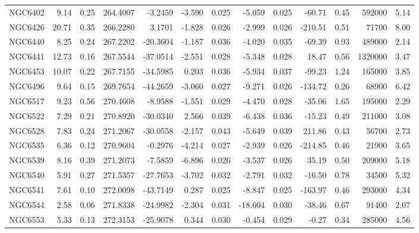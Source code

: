 \begin{longtable}{ | l | r | r| r | r | r | r | r | r | r | r | r | r  |}
            NGC6402       &   9.14 & 0.25 & 264.4007 &  -3.2459 &  -3.590 & 0.025 &  -5.059 &  0.025 &  -60.71 &  0.45 &  592000 &  5.14\\ 
            NGC6426       &  20.71 & 0.35 & 266.2280 &   3.1701 &  -1.828 & 0.026 &  -2.999 &  0.026 & -210.51 &  0.51 &   71700 &  8.00\\ 
            NGC6440       &   8.25 & 0.24 & 267.2202 & -20.3604 &  -1.187 & 0.036 &  -4.020 &  0.035 &  -69.39 &  0.93 &  489000 &  2.14\\ 
            NGC6441       &  12.73 & 0.16 & 267.5544 & -37.0514 &  -2.551 & 0.028 &  -5.348 &  0.028 &   18.47 &  0.56 & 1320000 &  3.47\\ 
            NGC6453       &  10.07 & 0.22 & 267.7155 & -34.5985 &   0.203 & 0.036 &  -5.934 &  0.037 &  -99.23 &  1.24 &  165000 &  3.85\\ 
            NGC6496       &   9.64 & 0.15 & 269.7654 & -44.2659 &  -3.060 & 0.027 &  -9.271 &  0.026 & -134.72 &  0.26 &   68900 &  6.42\\ 
            NGC6517       &   9.23 & 0.56 & 270.4608 &  -8.9588 &  -1.551 & 0.029 &  -4.470 &  0.028 &  -35.06 &  1.65 &  195000 &  2.29\\ 
            NGC6522       &   7.29 & 0.21 & 270.8920 & -30.0340 &   2.566 & 0.039 &  -6.438 &  0.036 &  -15.23 &  0.49 &  211000 &  3.08\\ 
            NGC6528       &   7.83 & 0.24 & 271.2067 & -30.0558 &  -2.157 & 0.043 &  -5.649 &  0.039 &  211.86 &  0.43 &   56700 &  2.73\\ 
            NGC6535       &   6.36 & 0.12 & 270.9604 &  -0.2976 &  -4.214 & 0.027 &  -2.939 &  0.026 & -214.85 &  0.46 &   21900 &  3.65\\ 
            NGC6539       &   8.16 & 0.39 & 271.2073 &  -7.5859 &  -6.896 & 0.026 &  -3.537 &  0.026 &   35.19 &  0.50 &  209000 &  5.18\\ 
            NGC6540       &   5.91 & 0.27 & 271.5357 & -27.7653 &  -3.702 & 0.032 &  -2.791 &  0.032 &  -16.50 &  0.78 &   34500 &  5.32\\ 
            NGC6541       &   7.61 & 0.10 & 272.0098 & -43.7149 &   0.287 & 0.025 &  -8.847 &  0.025 & -163.97 &  0.46 &  293000 &  4.34\\ 
            NGC6544       &   2.58 & 0.06 & 271.8338 & -24.9982 &  -2.304 & 0.031 & -18.604 &  0.030 &  -38.46 &  0.67 &   91400 &  2.07\\ 
            NGC6553       &   5.33 & 0.13 & 272.3153 & -25.9078 &   0.344 & 0.030 &  -0.454 &  0.029 &   -0.27 &  0.34 &  285000 &  4.56\\ 

\end{longtable}
